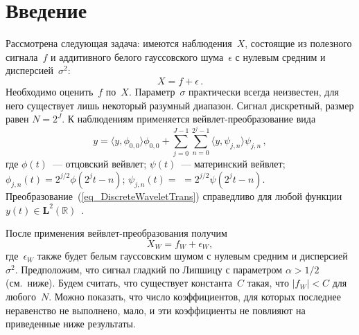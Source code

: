       \begin{multicols}{2}

      \label{st\stat}


\section{Введение}

Рассмотрена следующая задача: имеются на\-блю\-де\-ния~$X$, состоящие из полезного сигнала~$f$ 
и аддитивного белого гауссовского шума~$\epsilon$ с нулевым средним и  дисперсией~$\sigma^2$:
\begin{equation*}
X=f+\epsilon\,.
\end{equation*}
Необходимо оценить~$f$ по~$X$. Параметр~$\sigma$ практически всегда неизвестен, 
для него существует лишь некоторый разумный диапазон. Сигнал дискретный, размер 
равен $N=2^J$. К наблюдениям применяется вейвлет-преобразование вида
\begin{equation}
\label{eq_DiscreteWaveletTrans}
y=\langle y,\phi_{0,0}\rangle\phi_{0,0}+\sum_{j=0}^{J-1}\sum_{n=0}^{2^j-1}\langle y,\psi_{j,n}\rangle\psi_{j,n}\,,
\end{equation}
где $\phi(t)$~--- отцовский вейвлет; $\psi(t)$~--- материнский вейвлет; $\phi_{j,n}(t)=2^{j/2}\phi\left(2^jt-n\right)$; 
$\psi_{j,n}(t)=$\linebreak 
$=2^{j/2}\psi\left(2^jt-n\right)$. Преобразование~(\ref{eq_DiscreteWaveletTrans}) 
справедливо для любой функции $y(t)\in\mathbf{L}^2(\mathbb{R})$~\cite{3mar, 4mar}.

После применения вейвлет-преобразования получим
\begin{equation*}
X_W=f_W+\epsilon_W,
\end{equation*}
где~$\epsilon_W$ также будет белым гауссовским шумом с нулевым средним и дисперсией~$\sigma^2$. 
Предположим, что сигнал гладкий по Липшицу с параметром $\alpha>1/2$ (см.\ ниже). 
Будем считать, что существует константа~$C$ такая, что $|f_W|<C$ для любого~$N$. Можно показать, 
что число коэффициентов, для которых последнее неравенство не выполнено, мало, и эти коэффициенты 
не повлияют на приведенные ниже результаты.


\end{multicols}
